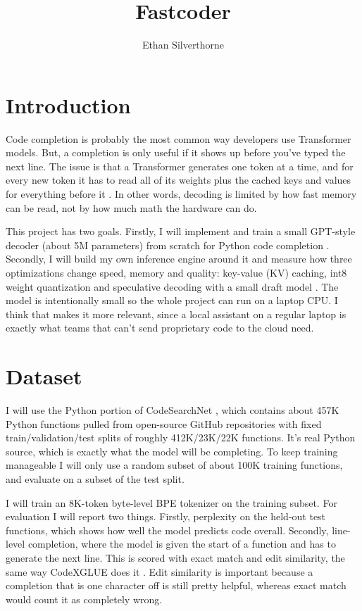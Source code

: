 \title{Fastcoder}
\author{
    Ethan Silverthorne
}
\affiliations{
}


\maketitle
\section{Introduction}
Code completion is probably the most common way developers use Transformer models. But, a completion is only useful if it shows up before you've typed the next line. The issue is that a Transformer generates one token at a time, and for every new token it has to read all of its weights plus the cached keys and values for everything before it \cite{pope2023efficiently}. In other words, decoding is limited by how fast memory can be read, not by how much math the hardware can do.

This project has two goals. Firstly, I will implement and train a small GPT-style decoder (about 5M parameters) from scratch for Python code completion \cite{vaswani2017attention,radford2019language}. Secondly, I will build my own inference engine around it and measure how three optimizations change speed, memory and quality: key-value (KV) caching, int8 weight quantization \cite{dettmers2022llmint8} and speculative decoding with a small draft model \cite{leviathan2023fast,chen2023accelerating}. The model is intentionally small so the whole project can run on a laptop CPU. I think that makes it more relevant, since a local assistant on a regular laptop is exactly what teams that can't send proprietary code to the cloud need.

\section{Dataset}
I will use the Python portion of CodeSearchNet \cite{husain2019codesearchnet}, which contains about 457K Python functions pulled from open-source GitHub repositories with fixed train/validation/test splits of roughly 412K/23K/22K functions. It's real Python source, which is exactly what the model will be completing. To keep training manageable I will only use a random subset of about 100K training functions, and evaluate on a subset of the test split.

I will train an 8K-token byte-level BPE tokenizer on the training subset. For evaluation I will report two things. Firstly, perplexity on the held-out test functions, which shows how well the model predicts code overall. Secondly, line-level completion, where the model is given the start of a function and has to generate the next line. This is scored with exact match and edit similarity, the same way CodeXGLUE does it \cite{lu2021codexglue}. Edit similarity is important because a completion that is one character off is still pretty helpful, whereas exact match would count it as completely wrong.

